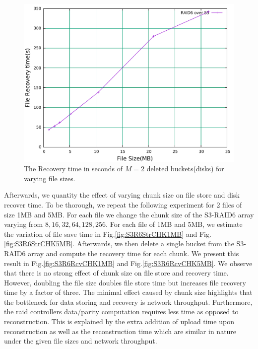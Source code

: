 \begin{figure}[h!]
\includegraphics[width=\linewidth]{figures/S3RAIDRecoveryTime.pdf}
\centering
\caption{The Recovery time in seconds of $M=2$ deleted buckets(disks) for varying file sizes.}
\label{fig:S3R6Rcv}
\end{figure}

Afterwards, we quantity the effect of varying chunk size on file store and disk recover time.
To be thorough, we repeat the following experiment for 2 files of size 1MB and 5MB.
For each file we change the chunk size of the S3-RAID6 array varying from $8, 16, 32, 64, 128, 256$. For each file of 1MB and 5MB, we estimate the variation of file save time in Fig.\ref{fig:S3R6StrCHK1MB} and Fig.\ref{fig:S3R6StrCHK5MB}.
Afterwards, we then delete a single bucket from the S3-RAID6 array and compute the recovery time for each chunk.
We present this result in Fig.\ref{fig:S3R6RcvCHK1MB} and Fig.\ref{fig:S3R6RcvCHK5MB}. 
We observe that there is no strong effect of chunk size on file store and recovery time.
However, doubling the file size doubles file store time but increases file recovery time by a factor of three.
The minimal effect caused by chunk size highlights that the bottleneck for data storing and recovery is network throughput.
Furthermore, the raid controllers data/parity computation requires less time as opposed to reconstruction.
This is explained by the extra addition of upload time upon reconstruction as well as the reconstruction time which are similar in nature under the given file sizes and network throughput.

